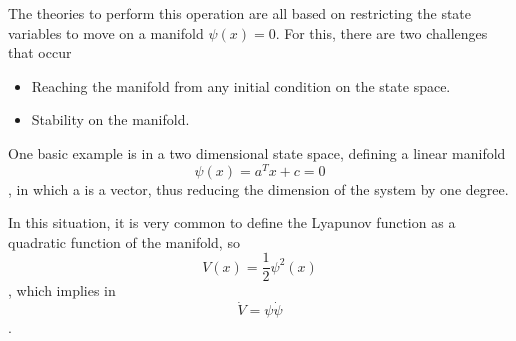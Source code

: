 The theories to perform this operation are all based on restricting the state variables to move on a manifold $\psi(x)=0$. For this, there are two challenges that occur
\begin{itemize}
    \item Reaching the manifold from any initial condition on the state space.
    \item Stability on the manifold.
\end{itemize}
One basic example is in a two dimensional state space, defining a linear manifold \[
    \psi(x) = a^{T}x + c = 0
\], in which a is a vector, thus reducing the dimension of the system by one degree.

In this situation, it is very common to define the Lyapunov function as a quadratic function of the manifold, so \[
    V(x) = \frac{1}{2}\psi^{2}(x)
\], which implies in \[
\dot{V}=\psi \dot{\psi}
\].
